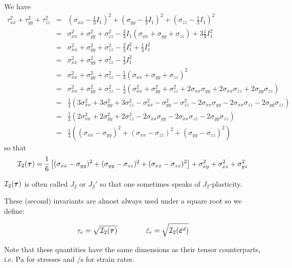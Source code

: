 We have 
\begin{eqnarray}
\tau_{xx}^2 + \tau_{yy}^2 + \tau_{zz}^2
&=& 
\left(\sigma_{xx}-\frac13 I_1\right)^2 + 
\left(\sigma_{yy}-\frac13 I_1\right)^2 + 
\left(\sigma_{zz}-\frac13 I_1\right)^2  \nonumber\\
&=&
\sigma_{xx}^2 + \sigma_{yy}^2 + \sigma_{zz}^2 
-\frac23 I_1 (\sigma_{xx} + \sigma_{yy} + \sigma_{zz}) 
+3\frac19 I_1^2 \nonumber\\
&=&
\sigma_{xx}^2 + \sigma_{yy}^2 + \sigma_{zz}^2 
-\frac23 I_1^2 +\frac13 I_1^2 \nonumber\\
&=&
\sigma_{xx}^2 + \sigma_{yy}^2 + \sigma_{zz}^2 
-\frac13 I_1^2  \nonumber\\
&=&
\sigma_{xx}^2 + \sigma_{yy}^2 + \sigma_{zz}^2 
-\frac13 (\sigma_{xx} + \sigma_{yy} + \sigma_{zz})^2 \nonumber\\
&=&
\sigma_{xx}^2 + \sigma_{yy}^2 + \sigma_{zz}^2 
-\frac13 (\sigma_{xx}^2 + \sigma_{yy}^2 + \sigma_{zz}^2
+2\sigma_{xx}\sigma_{yy}+2\sigma_{xx}\sigma_{zz}+2\sigma_{yy}\sigma_{zz} ) 
\nonumber\\
&=& \frac13 (
3\sigma_{xx}^2 + 3\sigma_{yy}^2 + 3\sigma_{zz}^2 
-\sigma_{xx}^2 - \sigma_{yy}^2 - \sigma_{zz}^2
-2\sigma_{xx}\sigma_{yy}-2\sigma_{xx}\sigma_{zz}-2\sigma_{yy}\sigma_{zz} ) 
\nonumber\\
&=& \frac13 (
2\sigma_{xx}^2 + 2\sigma_{yy}^2 + 2\sigma_{zz}^2 
-2 \sigma_{xx}\sigma_{yy}-2 \sigma_{xx}\sigma_{zz}-2 \sigma_{yy}\sigma_{zz} )\\
&=& \frac13 ((\sigma_{xx}-\sigma_{yy})^2 + (\sigma_{xx}-\sigma_{zz})^2
+ (\sigma_{yy}-\sigma_{zz})^2)
\end{eqnarray}
so that 
\[
{\cal I}_2({\bm \tau})   
=\frac{1}{6}\left[(\sigma_{xx}-\sigma_{yy})^2 + (\sigma_{yy}-\sigma_{zz})^2 + (\sigma_{xx}-\sigma_{zz})^2 \right]  
+ \sigma_{xy}^2 + \sigma_{xz}^2 + \sigma_{yz}^2 
\]

\begin{remark}
${\cal I}_2({\bm \tau})$ is often called $J_2$ or $J_2'$ so that one sometimes speaks of $J_2$-plasticity.
\end{remark}

These (second) invariants are almost always used under a square root so we define:
\begin{mdframed}[backgroundcolor=blue!5]
\begin{equation}
\tau_{e}=\sqrt{{\cal I}_2({\bm \tau})}
\quad\quad
\quad\quad
\dot{\varepsilon}_{e}=\sqrt{{\cal I}_2(\dot{\bm \varepsilon}^d)}
\label{eq:tauepse}
\end{equation}
\end{mdframed}
Note that these quantities have the same dimensions as their tensor counterparts, i.e. $\si{\pascal}$ 
for stresses and $\si{\per\second}$ for strain rates.

